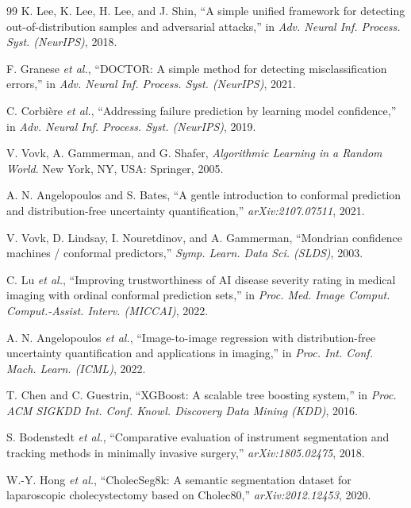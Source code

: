 \documentclass[letterpaper, 10 pt, conference]{ieeeconf}  %
\begin{document}
\begin{thebibliography}{99}
 K. Lee, K. Lee, H. Lee, and J. Shin, ``A simple unified
framework for detecting out-of-distribution samples and adversarial
attacks,'' in \emph{Adv. Neural Inf. Process. Syst. (NeurIPS)}, 2018.

 F. Granese \emph{et al.}, ``DOCTOR: A simple method for detecting misclassification
errors,'' in \emph{Adv. Neural Inf. Process. Syst. (NeurIPS)}, 2021.

 C. Corbi\`ere \emph{et al.}, ``Addressing failure prediction by learning model confidence,''
in \emph{Adv. Neural Inf. Process. Syst. (NeurIPS)}, 2019.

 V. Vovk, A. Gammerman, and G. Shafer, \emph{Algorithmic
Learning in a Random World}. New York, NY, USA: Springer, 2005.

 A. N. Angelopoulos and S. Bates, ``A gentle
introduction to conformal prediction and distribution-free uncertainty
quantification,'' \emph{arXiv:2107.07511}, 2021.

 V. Vovk, D. Lindsay, I. Nouretdinov, and
A. Gammerman, ``Mondrian confidence machines / conformal predictors,''
\emph{Symp. Learn. Data Sci. (SLDS)}, 2003.

 C. Lu \emph{et al.}, ``Improving trustworthiness of AI disease severity rating in
medical imaging with ordinal conformal prediction sets,'' in \emph{Proc. Med.
Image Comput. Comput.-Assist. Interv. (MICCAI)}, 2022.

 A. N. Angelopoulos \emph{et al.}, ``Image-to-image regression with distribution-free uncertainty quantification
and applications in imaging,'' in \emph{Proc. Int. Conf. Mach. Learn.
(ICML)}, 2022.

 T. Chen and C. Guestrin, ``XGBoost: A scalable tree
boosting system,'' in \emph{Proc. ACM SIGKDD Int. Conf. Knowl. Discovery Data
Mining (KDD)}, 2016.

 S. Bodenstedt \emph{et al.}, ``Comparative
evaluation of instrument segmentation and tracking methods in minimally
invasive surgery,'' \emph{arXiv:1805.02475}, 2018.

 W.-Y. Hong \emph{et al.}, ``CholecSeg8k: A semantic segmentation dataset for
laparoscopic cholecystectomy based on Cholec80,'' \emph{arXiv:2012.12453},
2020.

\end{thebibliography}
\end{document}
